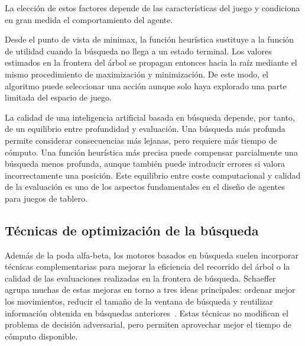 La elección de estos factores depende de las características del juego y condiciona en gran medida el comportamiento del agente.

Desde el punto de vista de minimax, la función heurística sustituye a la función de utilidad cuando la búsqueda no llega a un estado terminal. Los valores estimados en la frontera del árbol se propagan entonces hacia la raíz mediante el mismo procedimiento de maximización y minimización. De este modo, el algoritmo puede seleccionar una acción aunque solo haya explorado una parte limitada del espacio de juego.

La calidad de una inteligencia artificial basada en búsqueda depende, por tanto, de un equilibrio entre profundidad y evaluación. Una búsqueda más profunda permite considerar consecuencias más lejanas, pero requiere más tiempo de cómputo. Una función heurística más precisa puede compensar parcialmente una búsqueda menos profunda, aunque también puede introducir errores si valora incorrectamente una posición. Este equilibrio entre coste computacional y calidad de la evaluación es uno de los aspectos fundamentales en el diseño de agentes para juegos de tablero.


\subsection{Técnicas de optimización de la búsqueda}

Además de la poda alfa-beta, los motores basados en búsqueda suelen incorporar técnicas complementarias para mejorar la eficiencia del recorrido del árbol o la calidad de las evaluaciones realizadas en la frontera de búsqueda. Schaeffer agrupa muchas de estas mejoras en torno a tres ideas principales: ordenar mejor los movimientos, reducir el tamaño de la ventana de búsqueda y reutilizar información obtenida en búsquedas anteriores~\cite{schaeffer1989historyHeuristic}. Estas técnicas no modifican el problema de decisión adversarial, pero permiten aprovechar mejor el tiempo de cómputo disponible.

